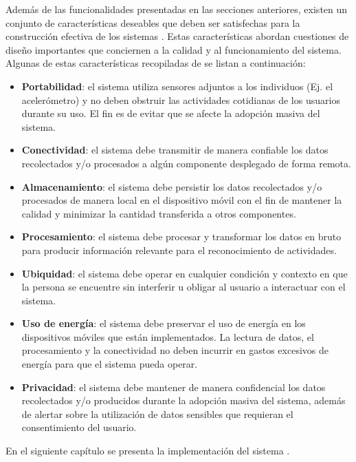 \label{ssec46:caracteristicas}Además de las funcionalidades presentadas
en las secciones anteriores, existen un conjunto de características
deseables que deben ser satisfechas para la construcción efectiva
de los sistemas . Estas características abordan cuestiones
de diseño importantes que conciernen a la calidad y al funcionamiento
del sistema. Algunas de estas características recopiladas de \cite{Choudhury2008,LaraLabrador2013}
se listan a continuación:
\begin{itemize}
\item \textbf{Portabilidad}: el sistema utiliza sensores adjuntos a los
individuos (Ej. el acelerómetro) y no deben obstruir las actividades
cotidianas de los usuarios durante su uso. El fin es de evitar que
se afecte la adopción masiva del sistema. 
\item \textbf{Conectividad}: el sistema debe transmitir de manera confiable
los datos recolectados y/o procesados a algún componente desplegado
de forma remota. 
\item \textbf{Almacenamiento}: el sistema debe persistir los datos recolectados
y/o procesados de manera local en el dispositivo móvil con el fin
de mantener la calidad y minimizar la cantidad transferida a otros
componentes.
\item \textbf{Procesamiento}: el sistema debe procesar y transformar los
datos en bruto para producir información relevante para el reconocimiento
de actividades.
\item \textbf{Ubiquidad}: el sistema debe operar en cualquier condición
y contexto en que la persona se encuentre sin interferir u obligar
al usuario a interactuar con el sistema.
\item \textbf{Uso de energía}: el sistema debe preservar el uso de energía
en los dispositivos móviles que están implementados. La lectura de
datos, el procesamiento y la conectividad no deben incurrir en gastos
excesivos de energía para que el sistema pueda operar.
\item \textbf{Privacidad}: el sistema debe mantener de manera confidencial
los datos recolectados y/o producidos durante la adopción masiva del
sistema, además de alertar sobre la utilización de datos sensibles
que requieran el consentimiento del usuario.
\end{itemize}
En el siguiente capítulo se presenta la implementación del sistema
.
